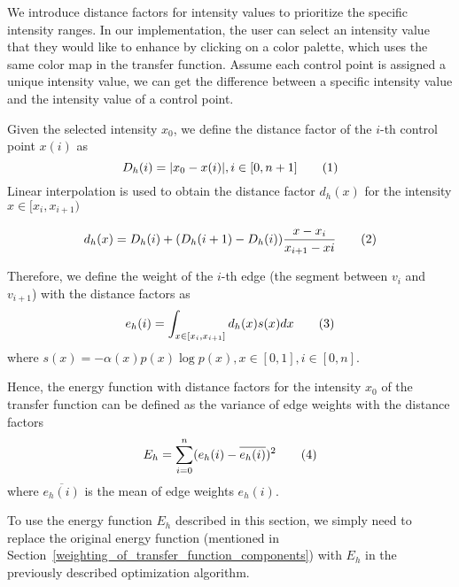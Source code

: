 
We introduce distance factors for intensity values to prioritize the specific intensity ranges.
In our implementation, the user can select an intensity value that they would like to enhance by clicking on a color palette, which uses the same color map in the transfer function.
Assume each control point is assigned a unique intensity value, we can get the difference between a specific intensity value and the intensity value of a control point.

Given the selected intensity $ x_{0} $, we define the distance factor of the $ i $-th control point $ x(i) $ as
\[  D_{h}(i)=|x_{0}-x(i)|, i \in [0,n+1] 
\addtag \]
Linear interpolation is used to obtain the distance factor $ d_{h}(x) $ for the intensity $ x \in [x_{i},x_{i+1}) $

\[ d_{h}(x)=D_{h}(i) + (D_{h}(i+1)-D_{h}(i))\frac{x-x_{i}}{x_{i+1}-x{i}} 
\addtag \]

Therefore, we define the weight of the $ i $-th edge (the segment between $ v_{i} $ and $ v_{i+1} $) with the distance factors as
\[
e_{h}(i)=\int_{x \in [x_{i}, x_{i+1}]} d_{h}(x)s(x) dx
\addtag \]
where $ s(x)=-\alpha(x)p(x) \log p(x), x \in [0,1], i \in [0,n]$.

Hence, the energy function with distance factors for the intensity $ x_{0} $ of the transfer function can be defined as the variance of edge weights with the distance factors
\[
E_{h}=\sum_{i=0}^{n}(e_{h}(i)-\overline{e_{h}(i)})^{2}
\addtag \]
where $ \overline{e_{h}(i)} $ is the mean of edge weights $e_{h}(i)$.

To use the energy function $ E_{h} $ described in this section, we simply need to replace the original energy function (mentioned in Section~\ref{weighting_of_transfer_function_components}) with $ E_{h} $ in the previously described optimization algorithm.


